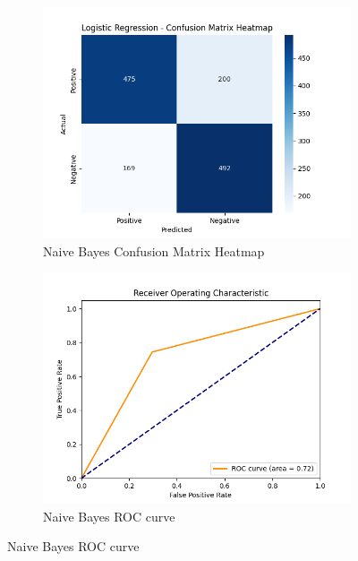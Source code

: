 \documentclass[conference, onecolumn]{IEEEtran}
\begin{document}
\begin{figure}[htbp]
    \begin{subfigure}{0.33\textwidth}
        \centering
        \includegraphics[width=\linewidth]{"../../images/logistic_regression/confusion_matrix_heatmap.png"}
        \caption{Naive Bayes Confusion Matrix Heatmap}
        \label{fig:naive_bayes_1}
    \end{subfigure}
    \begin{subfigure}{0.33\textwidth}
        \centering
        \includegraphics[width=\linewidth]{"../../images/logistic_regression/roc_curve.png"}
        \caption{Naive Bayes ROC curve}
        \label{fig:navie_bayes_2}
    \end{subfigure}

\end{figure}
\end{document}
